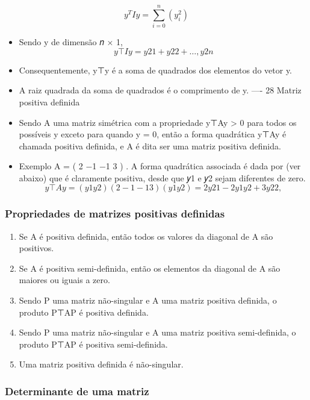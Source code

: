 \documentclass[
]{article}
\providecommand{\tightlist}{%
  \setlength{\itemsep}{0pt}\setlength{\parskip}{0pt}}
\begin{document}
\[
y^{T}Iy = \sum^{n}_{i=0}(y^{2}_{i})
\]

\begin{itemize}
\item
  Sendo y de dimensão 𝑛 × 1, \[
  y⊤Iy = 𝑦2
  1 + 𝑦2
  2 + … , 𝑦2
  n
  \]
\item
  Consequentemente, y⊤y é a soma de quadrados dos elementos do vetor y.
\item
  A raiz quadrada da soma de quadrados é o comprimento de y. ---- 28
  Matriz positiva definida
\item
  Sendo A uma matriz simétrica com a propriedade y⊤Ay \textgreater{} 0
  para todos os possíveis y exceto para quando y = 0, então a forma
  quadrática y⊤Ay é chamada positiva definida, e A é dita ser uma matriz
  positiva definida.
\item
  Exemplo A = ( 2 −1 −1 3 ) . A forma quadrática associada é dada por
  (ver abaixo) que é claramente positiva, desde que 𝑦1 e 𝑦2 sejam
  diferentes de zero. \[
  y⊤Ay = (𝑦1 𝑦2) ( 2 −1
  −1 3 ) (𝑦1
  𝑦2
  ) = 2𝑦2
  1 − 2𝑦1𝑦2 + 3𝑦2
  2 ,
  \]
\end{itemize}

\hypertarget{propriedades-de-matrizes-positivas-definidas}{%
\subsubsection{Propriedades de matrizes positivas
definidas}\label{propriedades-de-matrizes-positivas-definidas}}

\begin{enumerate}
\def\labelenumi{\arabic{enumi}.}
\tightlist
\item
  Se A é positiva definida, então todos os valores da diagonal de A são
  positivos.
\item
  Se A é positiva semi-definida, então os elementos da diagonal de A são
  maiores ou iguais a zero.
\item
  Sendo P uma matriz não-singular e A uma matriz positiva definida, o
  produto P⊤AP é positiva definida.
\item
  Sendo P uma matriz não-singular e A uma matriz positiva semi-definida,
  o produto P⊤AP é positiva semi-definida.
\item
  Uma matriz positiva definida é não-singular.
\end{enumerate}

\hypertarget{determinante-de-uma-matriz}{%
\subsubsection{Determinante de uma
matriz}\label{determinante-de-uma-matriz}}
\end{document}
